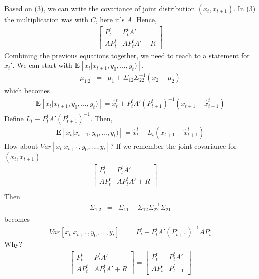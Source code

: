 Based on (3), we can write the covariance of joint distribution
$(x_t,x_{t+1})$. In (3) the multiplication was with $C$, here it's
$A$. Hence,
\begin{eqnarray*}
\left[ \begin{array}{cc}
      P_{t}^t & P_{t}^tA' \\
      AP_{t}^t & AP_{t}^tA'+R
      \end{array} \right]
\end{eqnarray*}
Combining the previous equations together, we need to reach to a statement for
$x_{t}'$. We can start with $\mathbf{E}[x_t|x_{t+1},y_0,...,y_t)]$.
\begin{eqnarray*}
\mu_{1|2} &=& \mu_1 + \Sigma_{12}\Sigma_{22}^{-1}(x_2 - \mu_2)
\end{eqnarray*}
which becomes
\begin{eqnarray*}
\mathbf{E}[x_t|x_{t+1},y_0,...,y_t)] = \hat{x}_{t}^t+P_{t}^tA'(P_{t+1}^t)^{-1}(x_{t+1}-\hat{x}_{t+1}^t)
\end{eqnarray*}
Define $L_t \equiv P_{t}^tA'(P_{t+1}^t)^{-1}$. Then,
\begin{eqnarray*}
\mathbf{E}[x_t|x_{t+1},y_0,...,y_t)] =
\hat{x}_{t}^t+L_t(x_{t+1}-\hat{x}_{t+1}^t)
\end{eqnarray*}
How about $Var[x_t|x_{t+1},y_0,...,y_t]$? If we remember the joint covariance
for $(x_t,x_{t+1})$
\begin{eqnarray*}
 \left[ \begin{array}{cc} 
      P_{t}^t & P_{t}^tA' \\
      AP_{t}^t & AP_{t}^tA'+R
      \end{array} \right] && \\
\end{eqnarray*}
Then
\begin{eqnarray*}
\Sigma_{1|2} &=& \Sigma_{11}-\Sigma_{12}\Sigma_{22}^{-1}\Sigma_{21}
\end{eqnarray*}
becomes
\begin{eqnarray*}
Var[x_t|x_{t+1},y_0,...,y_t] &=& P_{t}^t - P_{t}^tA'(P_{t+1}^t)^{-1}AP_{t}^t
\end{eqnarray*}
Why?
\begin{eqnarray*}
\left[ \begin{array}{cc}
      P_{t}^t & P_{t}^tA' \\
      AP_{t}^t & AP_{t}^tA'+R
      \end{array} \right]
=      
\left[ \begin{array}{cc}
      P_{t}^t & P_{t}^tA' \\
      AP_{t}^t & P_{t+1}^t
      \end{array} \right]
\end{eqnarray*}
